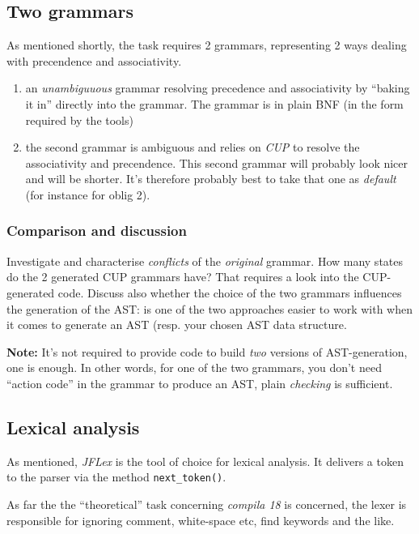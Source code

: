 \documentclass[11pt,freeform]{handout}[2014/08/13]
\begin{document}
\subsection{Two grammars}
\label{sec:two-grammars}


As mentioned shortly, the task requires 2 grammars, representing 2 ways
dealing with precendence and associativity.

\begin{enumerate}
\item an \emph{unambiguuous} grammar resolving precedence and associativity
  by ``baking it in'' directly into the grammar. The grammar is in plain
  BNF (in the form required by the tools)
\item the second grammar is ambiguous and relies on \emph{CUP} to resolve
  the associativity and precendence. This second grammar will probably look
  nicer and will be shorter. It's therefore probably best to take that one
  as \emph{default} (for instance for oblig 2).
\end{enumerate}

\subsubsection*{Comparison and discussion}
\label{sec:comparison}

Investigate and characterise \emph{conflicts} of the \emph{original}
grammar. How many states do the 2 generated CUP grammars have? That
requires a look into the CUP-generated code. Discuss also whether the
choice of the two grammars influences the generation of the AST: is one of
the two approaches easier to work with when it comes to generate an AST
(resp. your chosen AST data structure.


\textbf{Note:} It's not required to provide code to build \emph{two}
versions of AST-generation, one is enough. In other words, for one of the
two grammars, you don't need ``action code'' in the grammar to produce an
AST, plain \emph{checking} is sufficient.

\subsection{Lexical analysis}
\label{sec:lexical-analysis}

As mentioned, \textsl{JFLex} is the tool of choice for lexical analysis. It
delivers a token to the parser via the method \texttt{next\_token()}.  

As far the the ``theoretical'' task concerning \textsl{compila 18} is
concerned, the lexer is responsible for ignoring comment, white-space etc,
find keywords and the like. 
\end{document}
